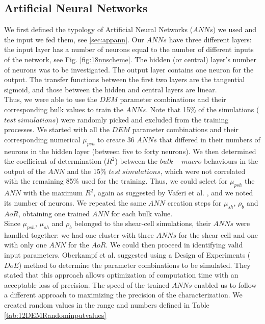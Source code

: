 \documentclass[review]{elsarticle}
\begin{document}
\subsection{Artificial Neural Networks}
\label{subsec:ann}
We first defined the typology of Artificial Neural Networks ($ANNs$) we used and
the input we fed them, see \ref{sec:appann}.
Our $ANNs$ have three different layers: the input layer has a number of neurons
equal to the number of different inputs of the network, see Fig. \ref{fig:18nnscheme}.
The hidden (or central) layer's number of neurons was to be investigated. 
The output layer contains one neuron for the output.
The transfer functions between the first two layers are the tangential sigmoid, 
and those between the hidden and central layers are linear.\\
Thus, we were able to use the $DEM$ parameter combinations and their
corresponding bulk values to train the $ANNs$.
Note that 15\% of the simulations ($test ~ simulations$) were
randomly picked and excluded from the training processes.
We started with all the $DEM$ parameter combinations and their corresponding
numerical $\mu_{psh}$ to create 36 $ANNs$ that differed in their numbers of
neurons in the hidden layer (between five to forty neurons).
We then determined the coefficient of determination ($R^2$) between the
$bulk-macro$ behaviours in the output of the $ANN$ and the 15\% $test ~ simulations$, 
which were not correlated with the remaining 85\% used for the training. 
Thus, we could select for $\mu_{psh}$ the $ANN$ with the maximum $R^2$, 
again as suggested by Vaferi et al. \cite{RefWorks:150}, and we noted its number
of neurons.
We repeated the same $ANN$ creation steps for $\mu_{sh}$, $\rho_b$
and $AoR$, obtaining one trained $ANN$ for each bulk value. \\
Since $\mu_{psh}$, $\mu_{sh}$ and $\rho_b$ belonged to the shear-cell
simulations, their $ANNs$ were handled together: we had one cluster with three 
$ANNs$ for the shear cell and one with only one $ANN$ for the $AoR$.
We could then proceed in identifying valid input parameters.
Oberkampf et al. \cite{RefWorks:160} suggested using a Design of Experiments
($DoE$) method to determine the parameter combinations to be simulated.
They stated that this approach allows optimization of computation time
with an acceptable loss of precision.
The speed of the trained $ANNs$ enabled us to follow a different approach to
maximizing the precision of the characterization.
We created random values
in the range and numbers defined in Table \ref{tab:12DEMRandominputvalues}
\end{document}
